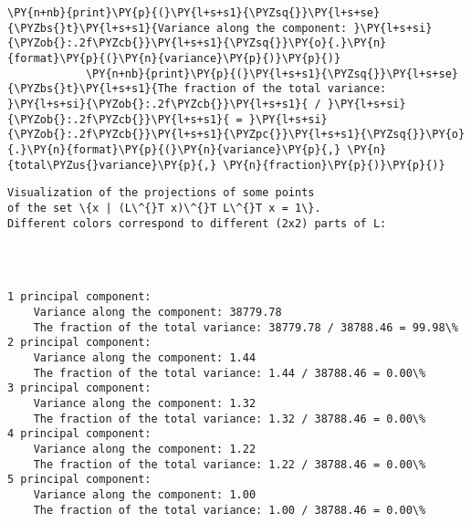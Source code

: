 \begin{Verbatim}[commandchars=\\\{\}]
            \PY{n+nb}{print}\PY{p}{(}\PY{l+s+s1}{\PYZsq{}}\PY{l+s+se}{\PYZbs{}t}\PY{l+s+s1}{Variance along the component: }\PY{l+s+si}{\PYZob{}:.2f\PYZcb{}}\PY{l+s+s1}{\PYZsq{}}\PY{o}{.}\PY{n}{format}\PY{p}{(}\PY{n}{variance}\PY{p}{)}\PY{p}{)}
            \PY{n+nb}{print}\PY{p}{(}\PY{l+s+s1}{\PYZsq{}}\PY{l+s+se}{\PYZbs{}t}\PY{l+s+s1}{The fraction of the total variance: }\PY{l+s+si}{\PYZob{}:.2f\PYZcb{}}\PY{l+s+s1}{ / }\PY{l+s+si}{\PYZob{}:.2f\PYZcb{}}\PY{l+s+s1}{ = }\PY{l+s+si}{\PYZob{}:.2f\PYZcb{}}\PY{l+s+s1}{\PYZpc{}}\PY{l+s+s1}{\PYZsq{}}\PY{o}{.}\PY{n}{format}\PY{p}{(}\PY{n}{variance}\PY{p}{,} \PY{n}{total\PYZus{}variance}\PY{p}{,} \PY{n}{fraction}\PY{p}{)}\PY{p}{)}
\end{Verbatim}

    \begin{Verbatim}[commandchars=\\\{\}]
Visualization of the projections of some points 
of the set \{x | (L\^{}T x)\^{}T L\^{}T x = 1\}.
Different colors correspond to different (2x2) parts of L:

    \end{Verbatim}

    \begin{center}
    \end{center}
    { \hspace*{\fill} \\}
    
    \begin{Verbatim}[commandchars=\\\{\}]

1 principal component:
	Variance along the component: 38779.78
	The fraction of the total variance: 38779.78 / 38788.46 = 99.98\%
2 principal component:
	Variance along the component: 1.44
	The fraction of the total variance: 1.44 / 38788.46 = 0.00\%
3 principal component:
	Variance along the component: 1.32
	The fraction of the total variance: 1.32 / 38788.46 = 0.00\%
4 principal component:
	Variance along the component: 1.22
	The fraction of the total variance: 1.22 / 38788.46 = 0.00\%
5 principal component:
	Variance along the component: 1.00
	The fraction of the total variance: 1.00 / 38788.46 = 0.00\%

    \end{Verbatim}

